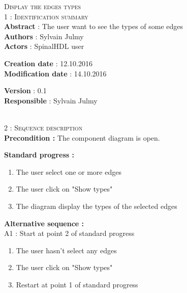 \begin{flushleft}
    \textsc{\huge Display the edges types}\\[0.5cm]

    \BlackLine
    \textsc{\Large 1 : Identification summary}\\[0.3cm]

        \textbf{\large Abstract} : The user want to see the types of some edges\\[0.1cm]

        \textbf{\large Authors} : Sylvain Julmy \\[0.3cm]			

        \textbf{\large Actors} : SpinalHDL user \\[0.1cm]	
    \begin{minipage}{0.40\textwidth}
        \begin{flushleft}	
            \textbf{\large Creation date} : 12.10.2016 \\[0.1cm]

            \textbf{\large Modification date} : 14.10.2016 \\[0.1cm]
        \end{flushleft}
    \end{minipage}
    \begin{minipage}{0.40\textwidth}
        \begin{flushleft}
            \textbf{\large Version} : 0.1 \\[0.1cm]

            \textbf{\large Responsible} : Sylvain Julmy \\[0.1cm]
        \end{flushleft}
    \end{minipage}
    \\[0.5cm]
    \BlackLine
    \textsc{\Large 2 : Sequence description}\\[0.3cm]

    \textbf{\large Precondition :} The component diagram is open.

    \textbf{\large  Standard progress :}
    \begin{enumerate}[nosep]
        \item The user select one or more edges
        \item The user click on "Show types"
        \item The diagram display the types of the selected edges
    \end{enumerate}

    \textbf{\large  Alternative sequence :}\\
    A1 : Start at point 2 of standard progress
    \begin{enumerate}[nosep]
        \item The user hasn't select any edges
        \item The user click on "Show types"
        \item Restart at point 1 of standard progress
    \end{enumerate}


\end{flushleft}
